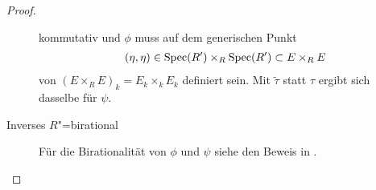 \begin{Lemma}
\begin{proof}
\begin{description}
\begin{center}
      \end{center}
      kommutativ und $\phi$ muss auf dem generischen Punkt
      \begin{gather*}
        (\eta,\eta)\in\operatorname{Spec}(R')\times_R\operatorname{Spec}(R')\subset E\times_R E  
      \end{gather*}
      von $(E\times_R E)_k=E_k\times_k E_k$ definiert sein.
      Mit $\tilde\tau$ statt $\tau$ ergibt sich dasselbe für $\psi$.
      
    \item[Inverses $R$"=birational]
      Für die Birationalität von $\phi$ und $\psi$ siehe
      den Beweis in \cite[Propsition~IV.6.10]{silverman2}.
      \qedhere
    \end{description}
  \end{proof}
\end{Lemma}

